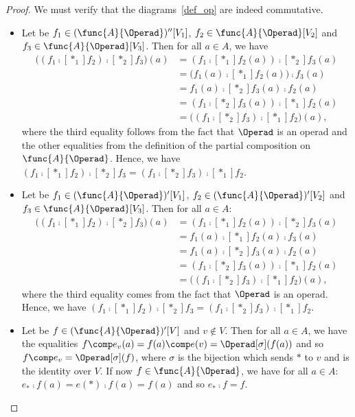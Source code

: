 \begin{proof}
    We must verify that the diagrams~\eqref{def_op} are indeed commutative.
    \begin{itemize}
        \item Let be $f_1\in(\func{A}{\Operad})''[V_1]$, $f_2\in\func{A}{\Operad}[V_2]$ and 
        $f_3\in\func{A}{\Operad}[V_3]$. Then for all $a\in A$, we have
        \begin{equation}\begin{split}
            \big((f_1\comp[\ast_1] f_2)\comp[\ast_2] f_3\big)(a) &= (f_1\comp[\ast_1] f_2(a))\comp[\ast_2] f_3(a) \\
            &= \big(f_1(a)\comp[\ast_1] f_2(a)\big)\comp f_3(a) \\
            &= f_1(a)\comp[\ast_2] f_3(a)\comp f_2(a) \\
            &= (f_1\comp[\ast_2] f_3(a))\comp[\ast_1] f_2(a) \\
            &= \big((f_1\comp[\ast_2] f_3)\comp[\ast_1] f_2\big)(a),
        \end{split}\end{equation}
        where the third equality follows from the fact that $\Operad$ is an operad and the other equalities 
        from the definition of the partial composition on $\func{A}{\Operad}$. Hence, we have 
        $(f_1\comp[\ast_1]f_2)\comp[\ast_2] f_3 = (f_1\comp[\ast_2]f_3)\comp[\ast_1]f_2$.
        
        \item Let be $f_1\in(\func{A}{\Operad})'[V_1]$, $f_2\in(\func{A}{\Operad})'[V_2]$ and 
        $f_3\in\func{A}{\Operad}[V_3]$. Then for all $a\in A$:
        \begin{equation}\begin{split}
            \big((f_1\comp[\ast_1] f_2)\comp[\ast_2] f_3\big)(a) &= (f_1\comp[\ast_1] f_2(a))\comp[\ast_2] f_3(a) \\
            &= f_1(a)\comp[\ast_1] f_2(a)\comp f_3(a) \\
            &= f_1(a)\comp[\ast_2] f_3(a)\comp f_2(a) \\
            &= (f_1\comp[\ast_2] f_3(a))\comp[\ast_1] f_2(a) \\
            &= \big((f_1\comp[\ast_2] f_3)\comp[\ast_1] f_2\big)(a),
        \end{split}\end{equation}
        where the third equality comes from the fact that $\Operad$ is an operad. Hence, we have 
        $(f_1\comp[\ast_1]f_2)\comp[\ast_2] f_3 = (f_1\comp[\ast_2] f_3)\comp[\ast_1] f_2$.
        
        \item Let be $f\in(\func{A}{\Operad})'[V]$ and $v\not\in V$. Then for all $a\in A$, we have 
        the equalities $f\comp e_v(a)= f(a)\comp e(v) = \Operad[\sigma](f(a))$ and so 
        $f\comp e_v=\Operad[\sigma](f)$, where $\sigma$ is the bijection which sends $\ast$ to $v$ and is 
        the identity over $V$. If now $f\in\func{A}{\Operad}$, we have for all 
        $a\in A$: $e_{\ast}\comp f(a)= e(\ast)\comp f(a) = f(a)$ and so $e_{\ast}\comp f = f$. \qedhere
    \end{itemize}
\end{proof}

